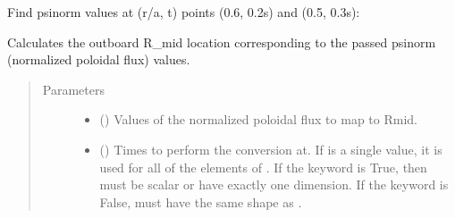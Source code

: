 \documentclass[letterpaper,10pt,english]{sphinxmanual}
\begin{document}
\begin{fulllineitems}
\begin{fulllineitems}
Find psinorm values at (r/a, t) points (0.6, 0.2s) and (0.5, 0.3s):

\begin{sphinxVerbatim}[commandchars=\\\{\}]
   \PYG{p}{[} \PYG{p}{]} \PYG{p}{[} \PYG{p}{]} 
\end{sphinxVerbatim}

\end{fulllineitems}


\begin{fulllineitems}
\label{\detokenize{eqtools:eqtools.core.Equilibrium.psinorm2rmid}}
Calculates the outboard R\_mid location corresponding to the passed psinorm (normalized poloidal flux) values.
\begin{quote}\begin{description}
\item[{Parameters}] \leavevmode\begin{itemize}
\item {} 
 () \textendash{} Values of the normalized
poloidal flux to map to Rmid.

\item {} 
 () \textendash{} Times to perform the conversion at.
If  is a single value, it is used for all of the elements of
. If the  keyword is True, then  must be scalar
or have exactly one dimension. If the  keyword is False,
 must have the same shape as .


\end{itemize}
\end{description}
\end{quote}
\end{fulllineitems}
\end{fulllineitems}
\end{document}
